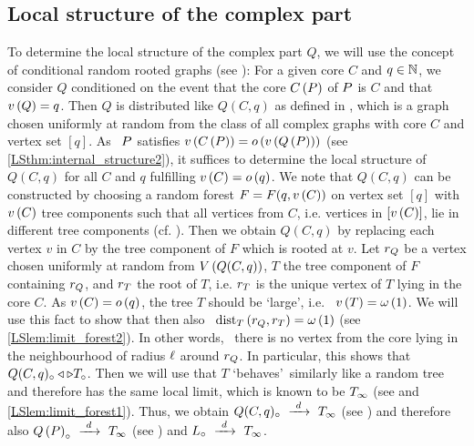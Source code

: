 \subsection{Local structure of the complex part}\label{LSsub:strategy_complex}
To determine the local structure of the complex part $Q$, we will use the concept of conditional random rooted graphs (see ): For a given core $C$ and $q\in\mathbb{N}$, we consider $Q$ conditioned on the event that the core $C\left(P\right)$ of $P$ is $C$ and that $v\left({Q}\right)=q$. Then $Q$ is distributed like $Q(C,q)$ as defined in , which is a graph chosen uniformly at random from the class of all complex graphs with core $C$ and vertex set $[q]$. As \whp\ $P$ satisfies $v\left({C\left(P\right)}\right)=o\left(v\left({Q\left(P\right)}\right)\right)$ (see \ref{LSthm:internal_structure2}), it suffices to determine the local structure of $Q(C,q)$ for all $C$ and $q$ fulfilling $v\left({C}\right)=o\left(q\right)$. We note that $Q(C,q)$ can be constructed by choosing a random forest $F=F(q, v\left({C}\right))$ on vertex set $[q]$ with $v\left({C}\right)$ tree components such that all vertices from $C$, i.e. vertices in $[v\left({C}\right)]$, lie in different tree components (cf. ). Then we obtain $Q(C,q)$ by replacing each vertex $v$ in $C$ by the tree component of $F$ which is rooted at $v$. Let $r_Q$ be a vertex chosen uniformly at random from $V\left(Q(C,q)\right)$, $T$ the tree component of $F$ containing $r_Q$, and $r_T$ the root of $T$, i.e. $r_T$ is the unique vertex of $T$ lying in the core $C$. As $v\left({C}\right)=o\left(q\right)$, the tree $T$ should be \lq large\rq, i.e. \whp\ $v\left({T}\right)=\omega\left(1\right)$. We will use this fact to show that then also \whp\ $\operatorname{dist}_{T}\left(r_Q, r_T\right)=\omega\left(1\right)$ (see \ref{LSlem:limit_forest2}). In other words, \whp\ there is no vertex from the core lying in the neighbourhood of radius $\ell$ around $r_Q$. In particular, this shows that $Q(C,q)_\circ \triangleleft \triangleright T_\circ$. Then we will use that $T$ \lq behaves\rq\ similarly like a random tree and therefore has the same local limit, which is known to be $T_\infty$ (see  and \ref{LSlem:limit_forest1}). Thus, we obtain $Q(C,q)_\circ~\xrightarrow{~d~}~T_\infty$ (see ) and therefore also $Q\left(P\right)_\circ~\xrightarrow{~d~}~T_\infty$ (see ) and $L_\circ~\xrightarrow{~d~}~T_\infty$.

